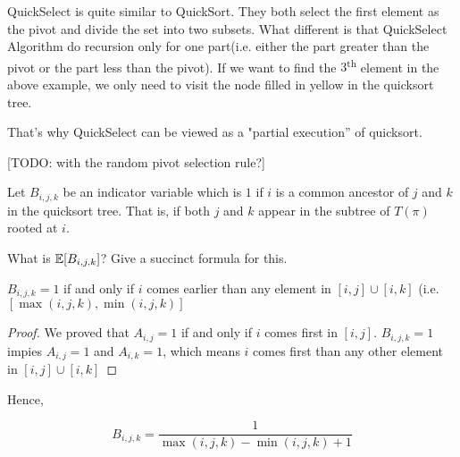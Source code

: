 \documentclass[11pt,a4paper,oneside]{article}
\newcommand{\nth}[1]{#1\textsuperscript{th}}
\newcommand{\E}{\mathop{\mathbb{E\/}}}
\begin{document}
\begin{problem}{5}
QuickSelect is quite similar to QuickSort. They both select the first element as the pivot and divide the set into two subsets. What different is that QuickSelect Algorithm do recursion only for one part(i.e. either the part greater than the pivot or the part less than the pivot). If we want to find the \nth{\(3\)} element in the above example, we only need to visit the node filled in yellow in the quicksort tree.

That's why QuickSelect can be viewed as a "partial execution'' of quicksort.

[TODO: with the random pivot selection rule?]

\end{problem}

\begin{problem}{6}
\statement
Let $B_{i,j,k}$ be an indicator variable which is $1$ if $i$ is a common ancestor
of $j$ and $k$ in the quicksort tree. That is, if both $j$ and $k$ appear in the 
subtree of $T(\pi)$ rooted at $i$.

What is $\E[B_{i,j,k}]$? Give a succinct formula for this.

\solution
\begin{lemma}
	\(B_{i, j, k} = 1\) if and only if \(i\) comes earlier than any element in \([i, j] \cup [i, k]\) (i.e. \([\max(i, j, k), \min(i, j, k)]\)
\end{lemma}

\begin{proof}
	We proved that \(A_{i, j} = 1\) if and only if \(i\) comes first in \([i, j]\). \(B_{i, j, k} = 1\) impies \(A_{i, j} = 1\) and \(A_{i, k} = 1\), which means \(i\) comes first than any other element in \([i, j] \cup [i, k]\)
\end{proof}

Hence,

\[ B_{i, j, k} = \frac{1}{\max(i, j, k) - \min(i, j, k) + 1} \]
\end{problem}
\end{document}
